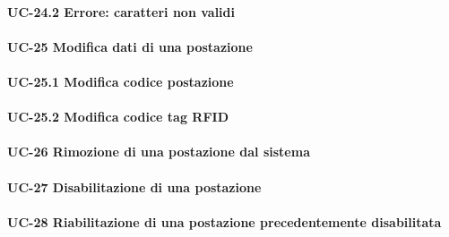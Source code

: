     \paragraph{UC-24.2 Errore: caratteri non validi}

\paragraph{UC-25 Modifica dati di una postazione}

    \paragraph{UC-25.1 Modifica codice postazione}
    
    \paragraph{UC-25.2 Modifica codice tag RFID}

 
\paragraph{UC-26 Rimozione di una postazione dal sistema}

\paragraph{UC-27 Disabilitazione di una postazione}

\paragraph{UC-28 Riabilitazione di una postazione precedentemente disabilitata}